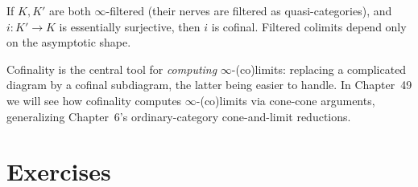 \begin{example_thm}
\label{ex:filtered-cofinal}
If $K, K'$ are both $\infty$-filtered (their nerves are filtered as
quasi-categories), and $i : K' \to K$ is essentially surjective, then $i$
is cofinal. Filtered colimits depend only on the asymptotic shape.
\end{example_thm}

\begin{remark}
Cofinality is the central tool for \emph{computing} $\infty$-(co)limits:
replacing a complicated diagram by a cofinal subdiagram, the latter being
easier to handle. In Chapter~49 we will see how cofinality computes
$\infty$-(co)limits via cone-cone arguments, generalizing Chapter~6's
ordinary-category cone-and-limit reductions.
\end{remark}


\section{Exercises}
\label{sec:joins-slices-exercises}

